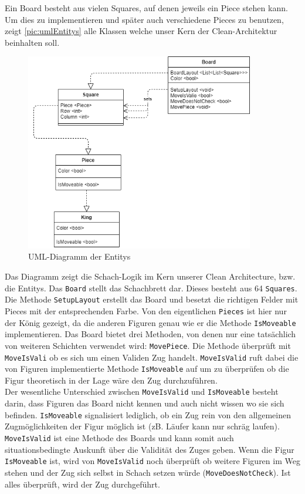 \documentclass{article}
\begin{document}
Ein Board besteht aus vielen Squares, auf denen jeweils ein Piece stehen kann. Um dies zu implementieren und später auch verschiedene Pieces zu benutzen, zeigt \autoref{pic:umlEntitys} alle Klassen welche unser Kern der Clean-Architektur beinhalten soll. 
\newpage
\begin{figure}[h]
	\begin{center}
		\includegraphics[width=10cm]{entitys.png}
		\caption{\label{pic:umlEntitys} UML-Diagramm der Entitys}
	\end{center}
\end{figure}
Das Diagramm zeigt die Schach-Logik im Kern unserer Clean Architecture, bzw. die Entitys. Das \texttt{Board} stellt das Schachbrett dar. Dieses besteht aus 64 \texttt{Squares}. Die Methode \texttt{SetupLayout} erstellt das Board und besetzt die richtigen Felder mit Pieces mit der entsprechenden Farbe.
Von den eigentlichen \texttt{Pieces} ist hier nur der König gezeigt, da die anderen Figuren genau wie er die Methode \texttt{IsMoveable} implementieren. 
Das Board bietet drei Methoden, von denen nur eine tatsächlich von weiteren Schichten verwendet wird: \texttt{MovePiece}. Die Methode überprüft mit \texttt{MoveIsVali} ob es sich um einen Validen Zug handelt. \texttt{MoveIsValid} ruft dabei die von Figuren implementierte Methode \texttt{IsMoveable} auf um zu überprüfen ob die Figur theoretisch in der Lage wäre den Zug durchzuführen.\\ Der wesentliche Unterschied zwischen \texttt{MoveIsValid} und \texttt{IsMoveable} besteht darin, dass Figuren das Board nicht kennen und auch nicht wissen wo sie sich befinden. \texttt{IsMoveable} signalisiert lediglich, ob ein Zug rein von den allgemeinen Zugmöglichkeiten der Figur möglich ist (zB. Läufer kann nur schräg laufen). \texttt{MoveIsValid} ist eine Methode des Boards und kann somit auch situationsbedingte Auskunft über die Validität des Zuges geben. Wenn die Figur \texttt{IsMoveable} ist, wird von \texttt{MoveIsValid} noch überprüft ob weitere Figuren im Weg stehen und der Zug sich selbst in Schach setzen würde (\texttt{MoveDoesNotCheck}). Ist alles überprüft, wird der Zug durchgeführt.
\end{document}
